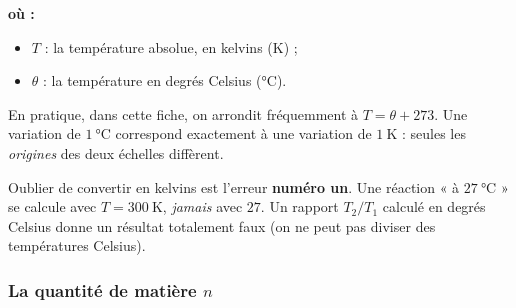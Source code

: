 \documentclass[11pt,a4paper]{article}
\newenvironment{ou}{%
  \par\smallskip\noindent\textbf{où :}\nopagebreak
  \begin{itemize}[leftmargin=1.8em,topsep=2pt,itemsep=1.5pt,parsep=0pt]}%
  {\end{itemize}}
\begin{document}
\begin{ou}
  \item $T$ : la température absolue, en kelvins (\si{\kelvin}) ;
  \item $\theta$ : la température en degrés Celsius (\si{\degreeCelsius}).
\end{ou}

\noindent En pratique, dans cette fiche, on arrondit fréquemment à $T=\theta+273$. Une variation de
$\qty{1}{\degreeCelsius}$ correspond exactement à une variation de $\qty{1}{\kelvin}$ : seules les
\emph{origines} des deux échelles diffèrent.

\begin{center}
\end{center}

\begin{attention}
Oublier de convertir en kelvins est l'erreur \textbf{numéro un}. Une réaction « à $\qty{27}{\degreeCelsius}$ »
se calcule avec $T=\qty{300}{\kelvin}$, \emph{jamais} avec $27$. Un rapport $T_2/T_1$ calculé en degrés
Celsius donne un résultat totalement faux (on ne peut pas diviser des températures Celsius).
\end{attention}

\subsubsection{La quantité de matière \texorpdfstring{$n$}{n}}
\end{document}
